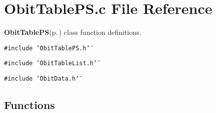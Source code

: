 \section{Obit\-Table\-PS.c File Reference}
\label{ObitTablePS_8c}
{\bf Obit\-Table\-PS}{\rm (p.\,\pageref{structObitTablePS})} class function definitions. 

{\tt \#include \char`\"{}Obit\-Table\-PS.h\char`\"{}}\par
{\tt \#include \char`\"{}Obit\-Table\-List.h\char`\"{}}\par
{\tt \#include \char`\"{}Obit\-Data.h\char`\"{}}\par
\subsection*{Functions}
